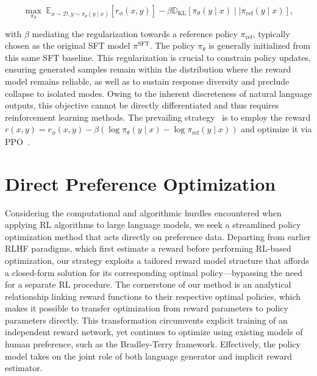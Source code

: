 \begin{equation}\label{eq:RL}
\max_{\pi_{\theta}} \; \mathbb{E}_{x\sim \mathcal{D}, y\sim \pi_{\theta}(y \mid x)}\left[r_{\phi}(x, y)\right] - \beta\mathbb{D}_{\textrm{KL}}\left[\pi_{\theta}(y\mid x)\mid \mid \pi_\text{ref}(y\mid x)\right],
\end{equation}

with $\beta$ mediating the regularization towards a reference policy $\pi_\text{ref}$, typically chosen as the original SFT model $\pi^\text{SFT}$. The policy $\pi_\theta$ is generally initialized from this same SFT baseline. This regularization is crucial to constrain policy updates, ensuring generated samples remain within the distribution where the reward model remains reliable, as well as to sustain response diversity and preclude collapse to isolated modes. Owing to the inherent discreteness of natural language outputs, this objective cannot be directly differentiated and thus requires reinforcement learning methods. The prevailing strategy~\citep{ziegler2020finetuning, stiennon2022learning, bai2022training, ouyang2022training} is to employ the reward $r(x, y) = r_{\phi}(x, y) -\beta \left(\log \pi_{\theta}(y\mid x) - \log \pi_\text{ref}(y\mid x)\right)$ and optimize it via PPO~\cite{schulman2017proximal}. 

\section{Direct Preference Optimization}\label{sec:DPO}

Considering the computational and algorithmic hurdles encountered when applying RL algorithms to large language models, we seek a streamlined policy optimization method that acts directly on preference data. Departing from earlier RLHF paradigms, which first estimate a reward before performing RL-based optimization, our strategy exploits a tailored reward model structure that affords a closed-form solution for its corresponding optimal policy—bypassing the need for a separate RL procedure. The cornerstone of our method is an analytical relationship linking reward functions to their respective optimal policies, which makes it possible to transfer optimization from reward parameters to policy parameters directly. This transformation circumvents explicit training of an independent reward network, yet continues to optimize using existing models of human preference, such as the Bradley-Terry framework. Effectively, the policy model takes on the joint role of both language generator and implicit reward estimator.

